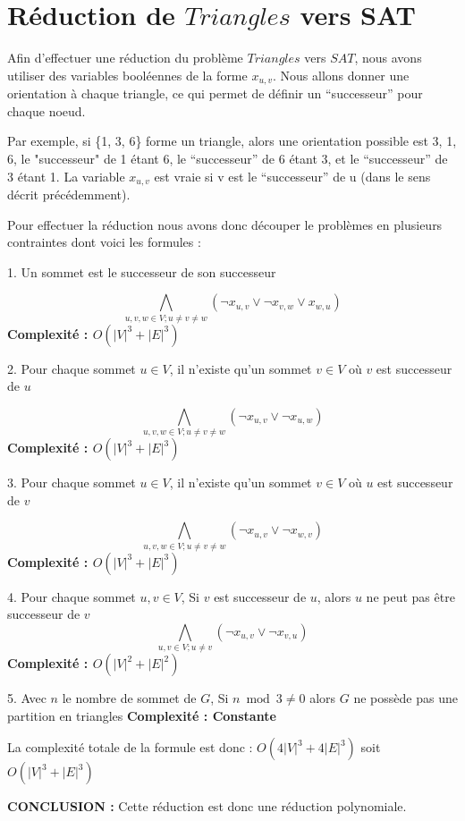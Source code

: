 \documentclass{article}
\begin{document}
    \section{Réduction de $Triangles$ vers SAT}
    
    Afin d'effectuer une réduction du problème $Triangles$ vers $SAT$, nous avons utiliser des variables booléennes de la forme $x_{u,v}$.
    Nous allons donner une orientation à chaque triangle, ce qui permet de définir un “successeur” pour chaque noeud. 
    
    Par exemple, si \{1, 3, 6\} forme un triangle, alors une orientation possible est 3, 1, 6, le "successeur" de 1 étant 6, le “successeur” de 6 étant 3, et le “successeur” de 3 étant 1. 
    La variable $x_{u,v}$ est vraie si v est le “successeur” de u (dans le sens décrit précédemment).
    
    Pour effectuer la réduction nous avons donc découper le problèmes en plusieurs contraintes dont voici les formules :
    
    \bigbreak
    
    1. Un sommet est le successeur de son successeur 
    
    $$ \bigwedge\limits_{u,v,w \in V; u \ne v \ne w} (\neg x_{u,v} \vee \neg x_{v,w} \vee x_{w,u}) $$
    \textbf{Complexité : $O(|V|^3 + |E|^3)$}
    \bigbreak
    
    2. Pour chaque sommet $u \in V$, il n'existe qu'un sommet $v \in V$ où $v$ est successeur de $u$
    
    $$ \bigwedge\limits_{u,v,w \in V; u \ne v \ne w} (\neg x_{u,v} \vee \neg x_{u,w}) $$
    \textbf{Complexité : $O(|V|^3 + |E|^3)$}
    \bigbreak
    
    3. Pour chaque sommet $u \in V$, il n'existe qu'un sommet $v \in V$ où $u$ est successeur de $v$
    
    $$ \bigwedge\limits_{u,v,w \in V; u \ne v \ne w} (\neg x_{u,v} \vee \neg x_{w,v}) $$
    \textbf{Complexité : $O(|V|^3 + |E|^3)$}
    \bigbreak
    
    4. Pour chaque sommet $u, v \in V$, Si $v$ est successeur de $u$, alors $u$ ne peut pas être successeur de $v$
    $$ \bigwedge\limits_{u,v \in V; u \ne v} (\neg x_{u,v} \vee \neg x_{v,u}) $$
    \textbf{Complexité : $O(|V|^2 + |E|^2)$}
    \bigbreak
    
    5. Avec $n$ le nombre de sommet de $G$, Si $n \bmod 3 \ne 0$ alors $G$ ne possède pas une partition en triangles 
    \smallbreak
    \noindent\textbf{Complexité : Constante}
    
    \bigbreak
    \noindent La complexité totale de la formule est donc :  \textbf{$O(4|V|^3 + 4|E|^3)$} soit \textbf{$O(|V|^3 + |E|^3)$}
    
    \smallbreak
    \noindent\textbf{CONCLUSION :} Cette réduction est donc une réduction polynomiale.
    
\end{document}
